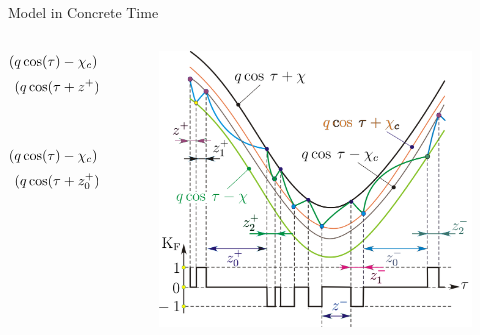 \begin{frame}{Model in Concrete Time}
	\vspace{-1em}
	\begin{columns}
		\begin{column}{.7 \textwidth}
			\begin{align*}
				(q \cos(\tau) - \chi_{c}) \cdot e^{z^{+}}                      = q \cos(\tau + z^{+}) - \chi_{0}            \\
				(q \cos(\tau + z^{+}) - \chi_{0} - 1) \cdot e^{z_{1}^{+}}      + 1  =                                \qquad \\
				q \cos(\tau + z^{+} + z_{1}^{+}) - \chi_{c}                                                                 \\\\
				(q \cos(\tau) - \chi_{c}) \cdot e^{z_{0}^{+}}                  = q \cos(\tau + z_{0}^{+}) + \chi_{0}        \\
				(q \cos(\tau + z_{0}^{+}) + \chi_{0} + 1) \cdot e^{z_{2}^{+}}  - 1  =                               \qquad  \\
				\hfill q \cos(\tau + z^{+} + z_{2}^{+}) + \chi_{c}
			\end{align*}
		\end{column}
		\begin{column}{.5 \textwidth}
			\begin{figure}
				\includegraphics[width=0.7 \textwidth]{Figs/discrete_model_derivation.png}
			\end{figure}
		\end{column}
	\end{columns}

	\flushright{[Avrutin]}
\end{frame}

